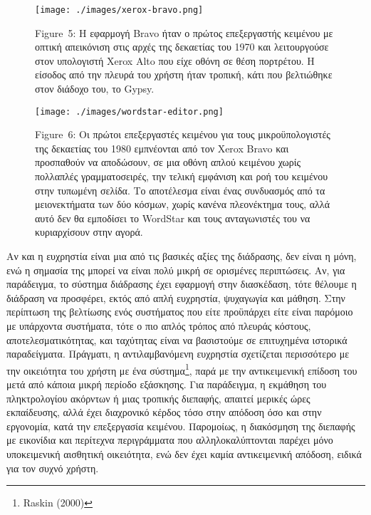 \documentclass[
]{article}
\begin{document}
\leavevmode{}%
\begin{figure}
\hypertarget{fig:xerox-bravo}{%
\centering
\texttt{[image: ./images/xerox-bravo.png]}
\caption{Figure~5: Η εφαρμογή Bravo ήταν ο πρώτος επεξεργαστής κειμένου
με οπτική απεικόνιση στις αρχές της δεκαετίας του 1970 και λειτουργούσε
στον υπολογιστή Xerox Alto που είχε οθόνη σε θέση πορτρέτου. Η είσοδος
από την πλευρά του χρήστη ήταν τροπική, κάτι που βελτιώθηκε στον διάδοχο
του, το Gypsy.}\label{fig:xerox-bravo}
}
\end{figure}

\leavevmode{}%
\begin{figure}
\hypertarget{fig:wordstar-editor}{%
\centering
\texttt{[image: ./images/wordstar-editor.png]}
\caption{Figure~6: Οι πρώτοι επεξεργαστές κειμένου για τους
μικροϋπολογιστές της δεκαετίας του 1980 εμπνέονται από τον Xerox Bravo
και προσπαθούν να αποδώσουν, σε μια οθόνη απλού κειμένου χωρίς πολλαπλές
γραμματοσειρές, την τελική εμφάνιση και ροή του κειμένου στην τυπωμένη
σελίδα. Το αποτέλεσμα είναι ένας συνδυασμός από τα μειονεκτήματα των δύο
κόσμων, χωρίς κανένα πλεονέκτημα τους, αλλά αυτό δεν θα εμποδίσει το
WordStar και τους ανταγωνιστές του να κυριαρχίσουν στην
αγορά.}\label{fig:wordstar-editor}
}
\end{figure}

Αν και η ευχρηστία είναι μια από τις βασικές αξίες της διάδρασης, δεν
είναι η μόνη, ενώ η σημασία της μπορεί να είναι πολύ μικρή σε ορισμένες
περιπτώσεις. Αν, για παράδειγμα, το σύστημα διάδρασης έχει εφαρμογή στην
διασκέδαση, τότε θέλουμε η διάδραση να προσφέρει, εκτός από απλή
ευχρηστία, ψυχαγωγία και μάθηση. Στην περίπτωση της βελτίωσης ενός
συστήματος που είτε προϋπάρχει είτε είναι παρόμοιο με υπάρχοντα
συστήματα, τότε ο πιο απλός τρόπος από πλευράς κόστους,
αποτελεσματικότητας, και ταχύτητας είναι να βασιστούμε σε επιτυχημένα
ιστορικά παραδείγματα. Πράγματι, η αντιλαμβανόμενη ευχρηστία σχετίζεται
περισσότερο με την οικειότητα του χρήστη με ένα σύστημα\footnote{Raskin
  (2000)}, παρά με την αντικειμενική επίδοση του μετά από κάποια μικρή
περίοδο εξάσκησης. Για παράδειγμα, η εκμάθηση του πληκτρολογίου ακόρντων
ή μιας τροπικής διεπαφής, απαιτεί μερικές ώρες εκπαίδευσης, αλλά έχει
διαχρονικό κέρδος τόσο στην απόδοση όσο και στην εργονομία, κατά την
επεξεργασία κειμένου. Παρομοίως, η διακόσμηση της διεπαφής με εικονίδια
και περίτεχνα περιγράμματα που αλληλοκαλύπτονται παρέχει μόνο
υποκειμενική αισθητική οικειότητα, ενώ δεν έχει καμία αντικειμενική
απόδοση, ειδικά για τον συχνό χρήστη.
\end{document}
